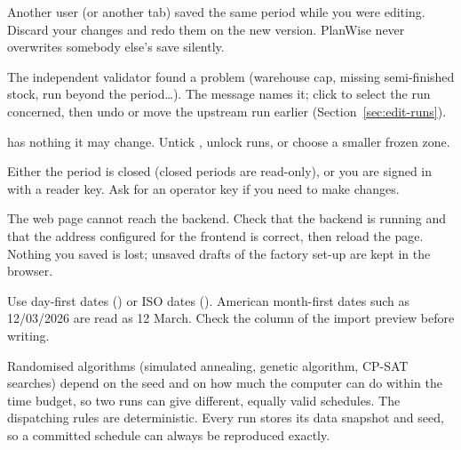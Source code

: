 Another user (or another tab) saved the same period while you were editing. Discard your changes and redo them
on the new version. PlanWise never overwrites somebody else's save silently.

The independent validator found a problem (warehouse cap, missing semi-finished stock, run beyond the period\dots).
The message names it; click  to select the run concerned, then undo or move the upstream run earlier
(Section~\ref{sec:edit-runs}).

 has nothing it may change. Untick , unlock runs, or choose a
smaller frozen zone.

Either the period is closed (closed periods are read-only), or you are signed in with a reader key. Ask for an
operator key if you need to make changes.

The web page cannot reach the backend. Check that the backend is running and that the address configured for
the frontend is correct, then reload the page. Nothing you saved is lost; unsaved drafts of the factory set-up
are kept in the browser.

Use day-first dates () or ISO dates (). American month-first dates such as
12/03/2026 are read as 12 March. Check the  column of the import preview before writing.

Randomised algorithms (simulated annealing, genetic algorithm, CP-SAT searches) depend on the seed and on how
much the computer can do within the time budget, so two runs can give different, equally valid schedules. The
dispatching rules are deterministic. Every run stores its data snapshot and seed, so a committed schedule can
always be reproduced exactly.
